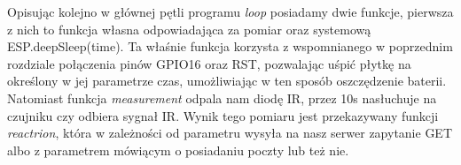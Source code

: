 Opisując kolejno w głównej pętli programu \textit{loop} posiadamy dwie funkcje, pierwsza z nich to funkcja własna odpowiadająca za pomiar oraz systemową ESP.deepSleep(time). Ta właśnie funkcja korzysta z wspomnianego w poprzednim rozdziale połączenia pinów GPIO16 oraz RST, pozwalając uśpić 
płytkę na określony w jej parametrze czas, umożliwiając w ten sposób oszczędzenie baterii. Natomiast funkcja \textit{measurement} odpala nam diodę IR, przez 10s nasłuchuje na czujniku czy odbiera sygnał IR. Wynik tego pomiaru jest przekazywany funkcji \textit{reactrion}, która w zależności od parametru wysyła na nasz serwer zapytanie GET albo z parametrem mówiącym o posiadaniu poczty lub też nie.
